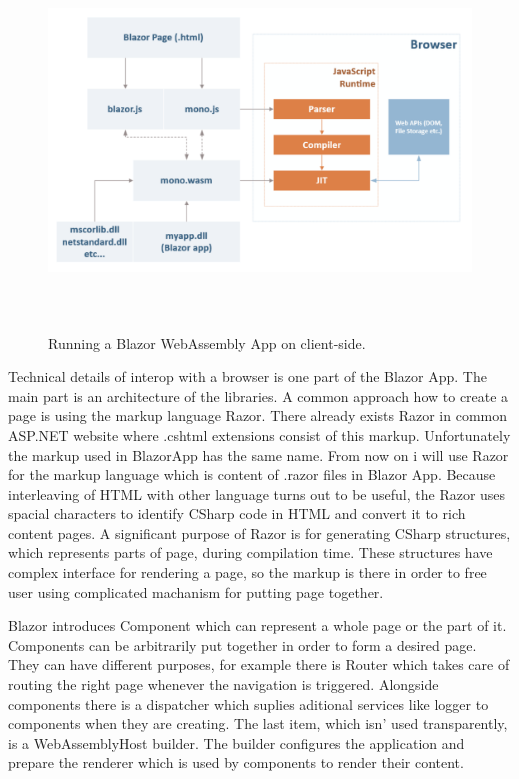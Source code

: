 \begin{figure}[H]\centering
\includegraphics[width=140mm, height=100mm]{./img/BlazorExecution}
\caption{Running a Blazor WebAssembly App on client-side.}
\label{img01:wasm}
\end{figure}

Technical details of interop with a browser is one part of the Blazor App.
The main part is an architecture of the libraries.
A common approach how to create a page is using the markup language Razor.
There already exists Razor in common ASP.NET website where .cshtml extensions consist of this markup.
Unfortunately the markup used in BlazorApp has the same name.
From now on i will use Razor for the markup language which is content of .razor files in Blazor App.
Because interleaving of HTML with other language turns out to be useful, the Razor uses spacial characters to identify CSharp code in HTML and convert it to rich content pages.
A significant purpose of Razor is for generating CSharp structures, which represents parts of page, during compilation time.
These structures have complex interface for rendering a page, so the markup is there in order to free user using complicated machanism for putting page together.

Blazor introduces Component which can represent a whole page or the part of it.
Components can be arbitrarily put together in order to form a desired page.
They can have different purposes, for example there is Router which takes care of routing the right page whenever the navigation is triggered.
Alongside components there is a dispatcher which suplies aditional services like logger to components when they are creating.
The last item, which isn' used transparently, is a WebAssemblyHost builder.
The builder configures the application and prepare the renderer which is used by components to render their content.

